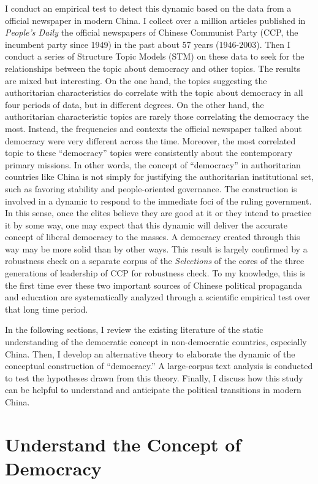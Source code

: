 \documentclass[abstracton,UTF8]{ctexart}
\begin{document}
I conduct an empirical test to detect this dynamic based on the data from a official newspaper in modern China. I collect over a million articles published in \textit{People's Daily} the official newspapers of Chinese Communist Party (CCP, the incumbent party since 1949) in the past about 57 years (1946-2003). Then I conduct a series of Structure Topic Models (STM) on these data to seek for the relationships between the topic about democracy and other topics. The results are mixed but interesting. On the one hand, the topics suggesting the authoritarian characteristics do correlate with the topic about democracy in all four periods of data, but in different degrees. On the other hand, the authoritarian characteristic topics are rarely those correlating the democracy the most. Instead, the frequencies and contexts the official newspaper talked about democracy were very different across the time. Moreover, the most correlated topic to these ``democracy'' topics were consistently about the contemporary primary missions. In other words, the concept of ``democracy'' in authoritarian countries like China is not simply for justifying the authoritarian institutional set, such as favoring stability and people-oriented governance. The construction is involved in a dynamic to respond to the immediate foci of the ruling government. In this sense, once the elites believe they are good at it or they intend to practice it by some way, one may expect that this dynamic will deliver the accurate concept of liberal democracy to the masses. A democracy created through this way may be more solid than by other ways. This result is largely confirmed by a robustness check on a separate corpus of the \textit{Selections} of the cores of the three generations of leadership of CCP for robustness check. To my knowledge, this is the first time ever these two important sources of Chinese political propaganda and education are systematically analyzed through a scientific empirical test over that long time period. 

In the following sections, I review the existing literature of the static understanding of the democratic concept in non-democratic countries, especially China. Then, I develop an alternative theory to elaborate the dynamic of the conceptual construction of ``democracy.'' A large-corpus text analysis is conducted to test the hypotheses drawn from this theory. Finally, I discuss how this study can be helpful to understand and anticipate the political transitions in modern China.
	
\section{Understand the Concept of Democracy}\label{s:literature}
\end{document}
